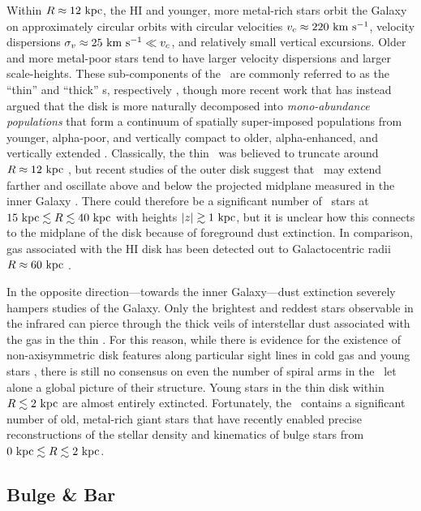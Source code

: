 Within $R\approx 12~\mathrm{kpc}$, the HI and younger, more metal-rich stars orbit the Galaxy on approximately circular orbits with circular velocities $v_c \approx 220~\mathrm{km}~\mathrm{s}^{-1}$, velocity dispersions $\sigma_v \approx 25~\mathrm{km}~\mathrm{s}^{-1} \ll v_c$, and relatively small vertical excursions. Older and more metal-poor stars tend to have larger velocity dispersions and larger scale-heights. These sub-components of the \mwdisk\ are commonly referred to as the ``thin'' and ``thick'' \mwdisk s, respectively \citep{todo}, though more recent work that has instead argued that the disk is more naturally decomposed into \emph{mono-abundance populations} that form a continuum of spatially super-imposed populations from younger, alpha-poor, and vertically compact to older, alpha-enhanced, and vertically extended \citep[see, e.g., Figure~12 and Section~6 in][]{rixbovy13}. Classically, the thin \mwdisk\ was believed to truncate around $R \approx 12~\mathrm{kpc}$ \citep{todo}, but recent studies of the outer disk suggest that \mwdisk\ may extend farther and oscillate above and below the projected midplane measured in the inner Galaxy \citep{xu15, apw15-triand}. There could therefore be a significant number of \mwdisk\ stars at $15~\mathrm{kpc} \lesssim R \lesssim 40~\mathrm{kpc}$ with heights $|z| \gtrsim 1~\mathrm{kpc}$, but it is unclear how this connects to the midplane of the disk because of foreground dust extinction. In comparison, gas associated with the HI disk has been detected out to Galactocentric radii $R \approx 60~\mathrm{kpc}$ \citep{kalberla08}.

In the opposite direction---towards the inner Galaxy---dust extinction severely hampers studies of the Galaxy. Only the brightest and reddest stars observable in the infrared can pierce through the thick veils of interstellar dust associated with the gas in the thin \mwdisk. For this reason, while there is evidence for the existence of non-axisymmetric disk features along particular sight lines in cold gas \citep{todo} and young stars \citep[cepheids;][]{todo}, there is still no consensus on even the number of spiral arms in the \mwdisk\ let alone a global picture of their structure. Young stars in the thin disk within $R \lesssim 2~\mathrm{kpc}$ are almost entirely extincted. Fortunately, the \mwbulge\ contains a significant number of old, metal-rich giant stars that have recently enabled precise reconstructions of the stellar density and kinematics of bulge stars from $0~\mathrm{kpc} \lesssim R \lesssim 2~\mathrm{kpc}$.

\subsection{Bulge \& Bar}

